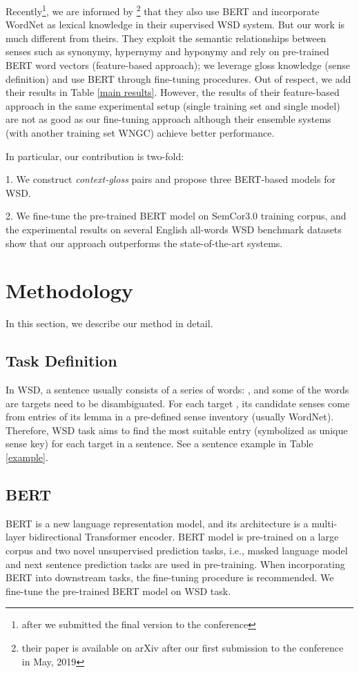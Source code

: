 \documentclass[11pt,a4paper]{article}
\begin{document}
Recently\footnote{after we submitted the final version to the conference}, we are informed by \citet{vial2019sense}\footnote{their paper is available on arXiv after our first submission to the conference in May, 2019} that they also use BERT and incorporate WordNet as lexical knowledge in their supervised WSD system. But our work is much different from theirs. They exploit the semantic relationships between senses such as synonymy, hypernymy and hyponymy and rely on pre-trained BERT word vectors (feature-based approach); we leverage gloss knowledge (sense definition) and use BERT through fine-tuning procedures. Out of respect, we add their results in Table \ref{main results}. However, the results of their feature-based approach in the same experimental setup (single training set and single model) are not as good as our fine-tuning approach although their ensemble systems (with another training set WNGC) achieve better performance.

In particular, our contribution is two-fold:


1. We construct \textit{context-gloss} pairs and propose three BERT-based models for WSD.

2. We fine-tune the pre-trained BERT model on SemCor3.0 training corpus, and the experimental results on several English all-words WSD benchmark datasets show that our approach outperforms the state-of-the-art systems.




\section{Methodology}

In this section, we describe our method in detail.

\subsection{Task Definition}
In WSD, a sentence  usually consists of a series of words: , and some of the words  are targets  need to be disambiguated. For each target , its candidate senses  come from entries of its lemma in a pre-defined sense inventory (usually WordNet). Therefore, WSD task aims to find the most suitable entry (symbolized as unique sense key) for each target in a sentence. See a sentence example in Table \ref{example}.

\subsection{BERT}
BERT \citep{devlin2018bert} is a new language representation model, and its architecture is a multi-layer bidirectional Transformer encoder. BERT model is pre-trained on a large corpus and two novel unsupervised prediction tasks, i.e., masked language model and next sentence prediction tasks are used in pre-training. When incorporating BERT into downstream tasks, the fine-tuning procedure is recommended. We fine-tune the pre-trained BERT model on WSD task.
\end{document}
